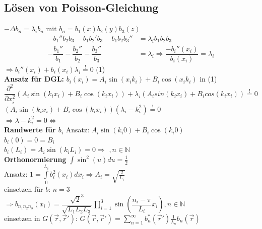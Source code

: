 \documentclass[german, fourcolumn, 6pt]{latex4ei/latex4ei_sheet}
\begin{document}
\subsection{Lösen von Poisson-Gleichung}
$-\Delta b_n = \lambda_ib_n$ mit $b_n=b_1(x)b_2(y)b_3(z)$
\begin{align*}
    -b_1''b_2b_3-b_1b_2'b_3-b_1b_2b_3''                       & =\lambda_ib_1b_2b_3                                            \\
    -\dfrac{b_1''}{b_1}-\dfrac{b_2''}{b_2}-\dfrac{b_3''}{b_3} & =\lambda_i \Rightarrow \dfrac{-b_i''(x_i)}{b_i(x_i)}=\lambda_i
\end{align*}
$\Rightarrow b_i''(x_i)+b_i(x_i)\lambda_i \stackrel{!}{=} 0$ \qquad (1)\\
\textbf{Ansatz für DGL: } $b_i(x_i)=A_i\sin(x_ik_i)+B_i\cos(x_ik_i)$ \quad in (1)\\
$\dfrac{\partial^2}{\partial x_i^2}(A_i\sin(k_ix_i)+B_i\cos(k_ix_i))+\lambda_i(A_isin(k_ix_i)+B_icos(k_ix_i)) \stackrel{!}{=} 0$\\
$(A_i\sin(k_ix_i)+B_i\cos(k_ix_i))(\lambda_i-k_i^2)\stackrel{!}{=}0$\\
$\Rightarrow \lambda-k_i^2=0 \Leftrightarrow$  \\
\textbf{Randwerte für $b_i$}
Ansatz: $A_i\sin(k_i 0)+B_i\cos(k_i 0)$\\
$b_i(0)=0=B_i$\\
$b_i(L_i)=A_i\sin(k_iL_i)=0\Rightarrow$ $, n\in \mathbb{N}$\\
\textbf{Orthonormierung}
$\int\sin^2(u)du=\frac{1}{2}$\\
Ansatz: $1 = \int\limits_0^{L_i}b_i^2(x_i)dx_i\Rightarrow A_i=\sqrt{\frac{2}{L_i}}$\\
einsetzen für $b$: $n=3$\\$\Rightarrow b_{n_1n_2n_3}(x_i)=\dfrac{\sqrt{2}^3}{\sqrt{L_1L_2L_3}}\prod\limits_{i=1}^3\sin\left(\dfrac{n_i-\pi}{L_i}x_i\right), n\in\mathbb{N}$\\
    einsetzen in $G(\vec{r},\vec{r}')$: $G(\vec{r},\vec{r}') = \sum\limits_{n=1}^{\infty}b_n^*(\vec{r}')\frac{1}{\lambda_n}b_n(\vec{r})$
\end{document}
